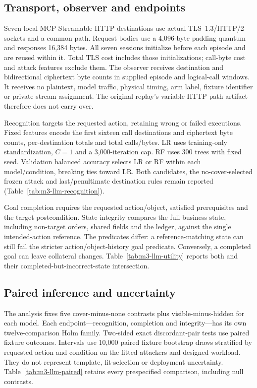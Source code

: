 \subsection{Transport, observer and endpoints}
Seven local MCP Streamable HTTP destinations use actual TLS~1.3/HTTP/2 sockets and a common  path. Request bodies use a 4,096-byte padding quantum and responses 16,384 bytes. All seven sessions initialize before each episode and are reused within it. Total TLS cost includes those initializations; call-byte cost and attack features exclude them. The observer receives destination and bidirectional ciphertext byte counts in supplied episode and logical-call windows. It receives no plaintext, model traffic, physical timing, arm label, fixture identifier or private stream assignment. The original replay's variable HTTP-path artifact therefore does not carry over.

Recognition targets the requested action, retaining wrong or failed executions. Fixed features encode the first sixteen call destinations and ciphertext byte counts, per-destination totals and total calls/bytes. LR uses training-only standardization, $C=1$ and a 3,000-iteration cap. RF uses 300 trees with fixed seed. Validation balanced accuracy selects LR or RF within each model/condition, breaking ties toward LR. Both candidates, the no-cover-selected frozen attack and last/penultimate destination rules remain reported (Table~\ref{tab:m3-llm-recognition}).

Goal completion requires the requested action/object, satisfied prerequisites and the target postcondition. State integrity compares the full business state, including non-target orders, shared fields and the ledger, against the single intended-action reference. The predicates differ: a reference-matching state can still fail the stricter action/object-history goal predicate. Conversely, a completed goal can leave collateral changes. Table~\ref{tab:m3-llm-utility} reports both and their completed-but-incorrect-state intersection.




\subsection{Paired inference and uncertainty}
The analysis fixes five cover-minus-none contrasts plus visible-minus-hidden for each model. Each endpoint---recognition, completion and integrity---has its own twelve-comparison Holm family. Two-sided exact discordant-pair tests use paired fixture outcomes. Intervals use 10,000 paired fixture bootstrap draws stratified by requested action and condition on the fitted attackers and designed workload. They do not represent template, fit-selection or deployment uncertainty. Table~\ref{tab:m3-llm-paired} retains every prespecified comparison, including null contrasts.

